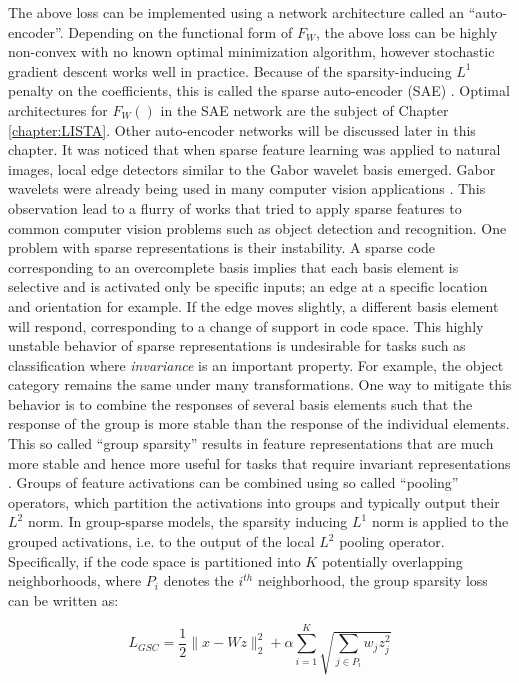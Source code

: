 The above loss can be implemented using a network architecture called an
``auto-encoder''. Depending on the functional form of $F_W$, the above loss can
be highly non-convex with no known optimal minimization algorithm,
however stochastic gradient descent works well in practice.  Because of the
sparsity-inducing $L^1$ penalty on the coefficients, this is called the sparse
auto-encoder (SAE) \cite{SAE1,SAE2}. Optimal architectures for $F_W()$ in the
SAE network are the subject of Chapter \ref{chapter:LISTA}. Other auto-encoder
networks will be discussed later in this chapter.    
\newline 
\indent  
It was noticed that when sparse feature learning was applied to natural images,
local edge detectors similar to the Gabor wavelet basis emerged. Gabor wavelets
were already being used in many computer vision applications \cite{SC,gabor}.
This observation lead to a flurry of works that tried to apply sparse features
to common computer vision problems such as object detection and recognition.
One problem with sparse representations is their instability. A sparse code
corresponding to an overcomplete basis implies that each basis element is
selective and is activated only be specific inputs; an edge at a specific
location and orientation for example. If the edge moves slightly, a different
basis element will respond, corresponding to a change of support in code space.
This highly unstable behavior of sparse representations is undesirable for
tasks such as classification where \emph{invariance} is an important property.
For example, the object category remains the same under many transformations.
One way to mitigate this behavior is to combine the responses of several basis
elements such that the response of the group is more stable than the response
of the individual elements.  This so called ``group sparsity'' results in
feature representations that are much more stable and hence more useful for
tasks that require invariant representations \cite{groupSparsity, ICA, yuan2006model}. 
Groups of feature activations can be combined using so called ``pooling''
operators, which partition the activations into groups and typically output
their $L^2$ norm.  In group-sparse models, the sparsity inducing $L^1$ norm is
applied to the grouped activations, i.e. to the output of the local $L^2$
pooling operator.  Specifically, if the code space is partitioned into $K$
potentially overlapping neighborhoods, where $P_i$ denotes the $i^{th}$
neighborhood, the group sparsity loss can be written as: 

\begin{equation} 
L_{GSC} = \frac{1}{2} \|x - Wz \|_2 ^ 2 + \alpha \sum_{i=1} ^ K \sqrt{\sum_{j \in P_i} w_jz_j ^2}  
\label{eqn:gsc_loss} 
\end{equation}

